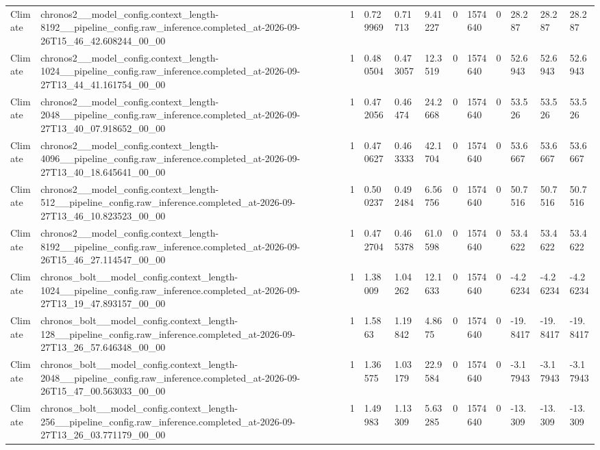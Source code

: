 \begin{tabular}{llllllllllll}
Climate & chronos2\_\_model\_config.context\_length-8192\_\_pipeline\_config.raw\_inference.completed\_at-2026-09-26T15\_46\_42.608244\_00\_00 & 1 & 0.729969 & 0.71713 & 9.41227 & 0 & 1574640 & 0 & 28.287 & 28.287 & 28.287 \\
Climate & chronos2\_\_model\_config.context\_length-1024\_\_pipeline\_config.raw\_inference.completed\_at-2026-09-27T13\_44\_41.161754\_00\_00 & 1 & 0.480504 & 0.473057 & 12.3519 & 0 & 1574640 & 0 & 52.6943 & 52.6943 & 52.6943 \\
Climate & chronos2\_\_model\_config.context\_length-2048\_\_pipeline\_config.raw\_inference.completed\_at-2026-09-27T13\_40\_07.918652\_00\_00 & 1 & 0.472056 & 0.46474 & 24.2668 & 0 & 1574640 & 0 & 53.526 & 53.526 & 53.526 \\
Climate & chronos2\_\_model\_config.context\_length-4096\_\_pipeline\_config.raw\_inference.completed\_at-2026-09-27T13\_40\_18.645641\_00\_00 & 1 & 0.470627 & 0.463333 & 42.1704 & 0 & 1574640 & 0 & 53.6667 & 53.6667 & 53.6667 \\
Climate & chronos2\_\_model\_config.context\_length-512\_\_pipeline\_config.raw\_inference.completed\_at-2026-09-27T13\_46\_10.823523\_00\_00 & 1 & 0.500237 & 0.492484 & 6.56756 & 0 & 1574640 & 0 & 50.7516 & 50.7516 & 50.7516 \\
Climate & chronos2\_\_model\_config.context\_length-8192\_\_pipeline\_config.raw\_inference.completed\_at-2026-09-26T15\_46\_27.114547\_00\_00 & 1 & 0.472704 & 0.465378 & 61.0598 & 0 & 1574640 & 0 & 53.4622 & 53.4622 & 53.4622 \\
Climate & chronos\_bolt\_\_model\_config.context\_length-1024\_\_pipeline\_config.raw\_inference.completed\_at-2026-09-27T13\_19\_47.893157\_00\_00 & 1 & 1.38009 & 1.04262 & 12.1633 & 0 & 1574640 & 0 & -4.26234 & -4.26234 & -4.26234 \\
Climate & chronos\_bolt\_\_model\_config.context\_length-128\_\_pipeline\_config.raw\_inference.completed\_at-2026-09-27T13\_26\_57.646348\_00\_00 & 1 & 1.5863 & 1.19842 & 4.8675 & 0 & 1574640 & 0 & -19.8417 & -19.8417 & -19.8417 \\
Climate & chronos\_bolt\_\_model\_config.context\_length-2048\_\_pipeline\_config.raw\_inference.completed\_at-2026-09-26T15\_47\_00.563033\_00\_00 & 1 & 1.36575 & 1.03179 & 22.9584 & 0 & 1574640 & 0 & -3.17943 & -3.17943 & -3.17943 \\
Climate & chronos\_bolt\_\_model\_config.context\_length-256\_\_pipeline\_config.raw\_inference.completed\_at-2026-09-27T13\_26\_03.771179\_00\_00 & 1 & 1.49983 & 1.13309 & 5.63285 & 0 & 1574640 & 0 & -13.309 & -13.309 & -13.309 \\

\end{tabular}
